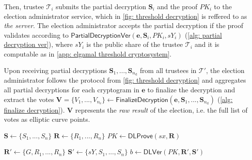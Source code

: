 Then, trustee $\mathcal{T}_i$ submits the partial decryption $\boldsymbol{S}_i$ and the proof $PK_i$ to the election administrator service, which in \cref{fig: threshold decryption} is reffered to as \textit{the server}. The election administrator accepts the partial decryption if the proof validates according to $\mathsf{PartialDecryptionVer}(\boldsymbol{e}, \boldsymbol{S}_i, PK_i, sY_i)$ (\cref{alg: partial decryption ver}), where $sY_i$ is the public share of the trustee $\mathcal{T}_i$ and it is computable as in \cref{app: elgamal threshold cryptosystem}.

Upon receiving partial decryptions $\boldsymbol{S}_1, ..., \boldsymbol{S}_{n_\mathrm{d}}$ from all trustees in $\boldsymbol{\mathcal{T}'}$, the election administrator follows the protocol from \cref{fig: threshold decryption} and aggregates all partial decryptions for each cryptogram in $\boldsymbol{e}$ to finalize the decryption and extract the votes $\boldsymbol{V} = \{ V_1, ..., V_{n_\mathrm{e}} \} \gets \mathsf{FinalizeDecryption} (\boldsymbol{e}, \boldsymbol{S}_1, ..., \boldsymbol{S}_{n_\mathrm{d}})$ (\cref{alg: finalize decryption}). $\boldsymbol{V}$ represents the \textit{raw result} of the election, i.e. the full list of votes as elliptic curve points.

\begin{algorithm}[ht]
    \DontPrintSemicolon
    \caption{$\mathsf{PartiallyDecryptAndProve}(\boldsymbol{e}, sx)$}
    
    $\boldsymbol{S} \gets \{S_1, ..., S_n\}$ \;
    $\boldsymbol{R} \gets \{R_1, ..., R_n\}$ \;
    $PK \gets \mathsf{DLProve}(sx, \boldsymbol{R})$ 
    
     
    
    \label{alg: partially decrypt and prove}
\end{algorithm}

\begin{algorithm}[ht]
    \DontPrintSemicolon
    \caption{$\mathsf{PartialDecryptionVer}(\boldsymbol{e}, \boldsymbol{S}, PK, sY)$}
    
    $\boldsymbol{R}' \gets \{G, R_1, ..., R_n\}$ \;
    $\boldsymbol{S}' \gets \{sY, S_1, ..., S_n\}$ \;
    $b \gets \mathsf{DLVer}(PK, \boldsymbol{R}', \boldsymbol{S}')$ 
    
     
    
    \label{alg: partial decryption ver}
\end{algorithm}

